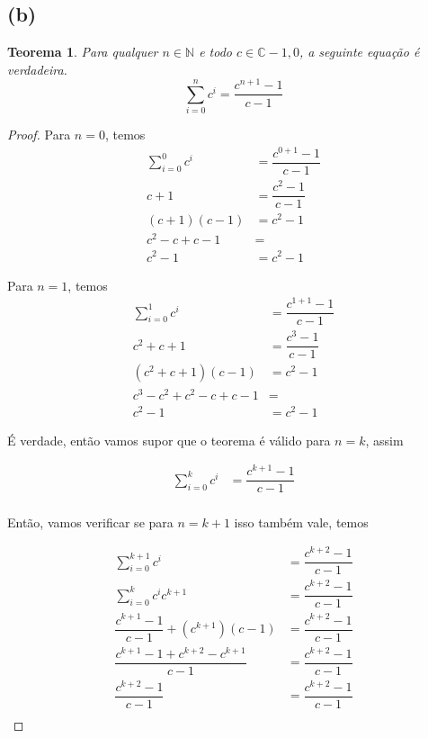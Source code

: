 \documentclass{article}
\begin{document}
\subsection*{(b)}
\newtheorem{teo2}{Teorema}
\begin{teo2}
    Para qualquer $n \in  \mathbb{N}$ e todo $c \in \mathbb{C} - {1,0}$,
    a seguinte equação é verdadeira.
	\begin{equation}
		\sum\limits_{i=0}^{n} c^i = \dfrac{c^{n+1} - 1}{c - 1}
	\end{equation}	
\end{teo2}
\begin{proof}
	Para $n = 0$, temos
	\begin{equation}
	\begin{split}
		\sum\limits_{i=0}^{0} c^i & = \dfrac{c^{0+1} - 1}{c - 1} \\
		c + 1 & = \dfrac{c^2 - 1}{c - 1} \\ 
		(c + 1)(c - 1) & = c^2 - 1 \\
		c^2 - c + c - 1 & = \\ 
		c^2 - 1 & = c^2 - 1
	\end{split}
	\end{equation}

	Para $n = 1$, temos
	\begin{equation}
	\begin{split}
		\sum\limits_{i=0}^{1} c^i & = \dfrac{c^{1+1} - 1}{c - 1} \\
		c^2 + c + 1 & = \dfrac{c^3 - 1}{c - 1} \\ 
		(c^2 + c + 1)(c - 1) & = c^2 - 1 \\
		c^3 - c^2 + c^2 -c + c - 1 & = \\ 
		c^2 - 1 & = c^2 - 1
	\end{split}
	\end{equation}

	É verdade, então vamos supor que o teorema é válido para $n = k$, assim

	\begin{equation}
	\begin{split}
		\sum\limits_{i=0}^{k} c^i & = \dfrac{c^{k+1} - 1}{c - 1} \\
	\end{split}
	\end{equation}

	Então, vamos verificar se para $n = k+1$ isso também vale, temos

	\begin{equation}
		\begin{split}
		\sum\limits_{i=0}^{k+1}c^i & = \dfrac{c^{k+2} - 1}{c - 1} \\
		\sum\limits_{i=0}^{k}c^i c^{k+1} & = \dfrac{c^{k+2} - 1}{c - 1} \\
		\dfrac{c^{k+1} - 1}{c - 1} + ( c^{k+1} )(c - 1) & = \dfrac{c^{k+2} - 1}{c - 1}\\
		\dfrac{c^{k+1} - 1 + c^{k+2} - c^{k+1}}{c - 1}  & = \dfrac{c^{k+2} - 1}{c - 1}\\
		\dfrac{c^{k+2} - 1 }{c - 1}  & = \dfrac{c^{k+2} - 1}{c - 1}\\
		\end{split}
	\end{equation}


\end{proof}
\end{document}
